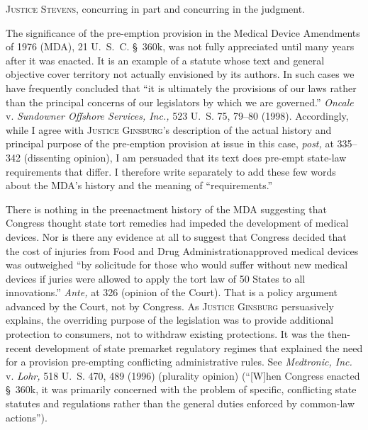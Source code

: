
\setcounter{page}{330}

  \textsc{Justice Stevens,} concurring in part and concurring in the
judgment.

  The significance of the pre-emption provision in the Medical
Device Amendments of 1976 (MDA), 21 U.~S.~C. \S~360k, \newpage 
was not fully appreciated until many years after it was enacted. It
is an example of a statute whose text and general objective cover
territory not actually envisioned by its authors. In such cases we have
frequently concluded that ``it is ultimately the provisions of our
laws rather than the principal concerns of our legislators by which
we are governed.'' \emph{Oncale} v. \emph{Sundowner Offshore Services,
Inc.,} 523 U.~S. 75, 79--80 (1998). Accordingly, while I agree
with \textsc{Justice Ginsburg}'s description of the actual history and
principal purpose of the pre-emption provision at issue in this case,
\emph{post,} at 335--342 (dissenting opinion), I am persuaded that its
text does pre-empt state-law requirements that differ. I therefore write
separately to add these few words about the MDA's history and the
meaning of ``requirements.''

  There is nothing in the preenactment history of the MDA suggesting
that Congress thought state tort remedies had impeded the development
of medical devices. Nor is there any evidence at all to suggest
that Congress decided that the cost of injuries from Food and Drug
Administrationapproved medical devices was outweighed ``by solicitude
for those who would suffer without new medical devices if juries were
allowed to apply the tort law of 50 States to all innovations.''
\emph{Ante,} at 326 (opinion of the Court). That is a policy argument
advanced by the Court, not by Congress. As \textsc{Justice Ginsburg}
persuasively explains, the overriding purpose of the legislation was to
provide additional protection to consumers, not to withdraw existing
protections. It was the then-recent development of state premarket
regulatory regimes that explained the need for a provision pre-empting
conflicting administrative rules. See \emph{Medtronic, Inc.} v. \emph{Lohr,}
518 U.~S. 470, 489 (1996) (plurality opinion) (``[W]hen Congress
enacted \S~360k, it was primarily concerned with the problem of
specific, conflicting state statutes and regulations rather than the
general duties enforced by common-law actions''). \newpage 



